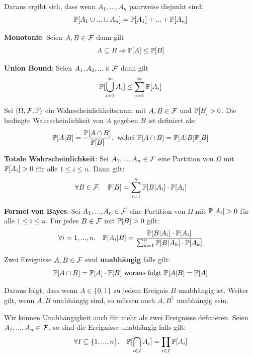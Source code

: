 Daraus ergibt sich, dass wenn $A_1, ..., A_n$ paarweise disjunkt sind: 
$$\mathbb{P}[A_1 \cup ... \cup A_n] = \mathbb{P}[A_1] + ... + \mathbb{P}[A_n]$$

\Satz \textbf{Monotonie}: Seien $A, B \in \mathcal{F}$ dann gilt 
$$A \subseteq B \Rightarrow \mathbb{P}[A] \leq \mathbb{P}[B]$$

\Satz \textbf{Union Bound}: Seien $A_1, A_2, ... \in \mathcal{F}$ dann gilt 
$$\mathbb{P}[\bigcup_{i = 1}^\infty A_i] \leq \sum_{i = 1}^\infty \mathbb{P}[A_i]$$



Sei $(\Omega, \mathcal{F}, \mathbb{P})$ ein Wahrscheinlichkeitsraum mit $A, B \in \mathcal{F}$ und $\mathbb{P}[B] > 0$. Die bedingte Wahrscheinlichkeit von $A$ gegeben $B$ ist definiert als:
$$\mathbb{P}[A | B] = \frac{\mathbb{P}[A \cap B]}{\mathbb{P}[B]}, \text{ wobei } \mathbb{P}[A \cap B] = \mathbb{P}[A | B] \mathbb{P}[B]$$

\Satz \textbf{Totale Wahrscheinlichkeit}: Sei $A_1, ..., A_n \in \mathcal{F}$ eine Partition von $\Omega$ mit $\mathbb{P}[A_i] > 0$ für alle $1 \leq i \leq n$. Dann gilt:
$$\forall B \in \mathcal{F}. \quad \mathbb{P}[B] = \sum_{i = 1}^n \mathbb{P}[B | A_i] \cdot \mathbb{P}[A_i]$$

\Satz \textbf{Formel von Bayes}: Sei $A_1, ..., A_n \in \mathcal{F}$ eine Partition von $\Omega$ mit $\mathbb{P}[A_i] > 0$ für alle $1 \leq i \leq n$. Für jedes $B \in \mathcal{F}$ mit $\mathbb{P}[B] > 0$ gilt:
$$\forall i = 1,...,n. \quad \mathbb{P}[A_i | B] = \frac{\mathbb{P}[B | A_i] \cdot \mathbb{P}[A_i]}{\sum_{k = 1}^n \mathbb{P}[B | A_k] \cdot \mathbb{P}[A_k]}$$



\begin{tcolorbox}
    Zwei Ereignisse $A, B \in \mathcal{F}$ sind \textbf{unabhängig} falls gilt:
    $$\mathbb{P}[A \cap B] = \mathbb{P}[A] \cdot \mathbb{P}[B] \text{ woraus folgt } \mathbb{P}[A | B] = \mathbb{P}[A]$$
\end{tcolorbox}

Daraus folgt, dass wenn $A \in \{0, 1\}$ zu jedem Ereignis $B$ unabhängig ist. Weiter gilt, wenn $A, B$ unabhängig sind, so müssen auch $A, B^\complement$ unabhängig sein. \medskip

Wir können Unabhängigkeit auch für mehr als zwei Ereignisse definieren. Seien $A_1, ..., A_n \in \mathcal{F}$, so sind die Ereignisse unabhängig falls gilt:
$$\forall I \subseteq \{1, ..., n\}. \quad \mathbb{P}[\bigcap_{i \in I} A_i] = \prod_{i \in I} \mathbb{P}[A_i]$$

